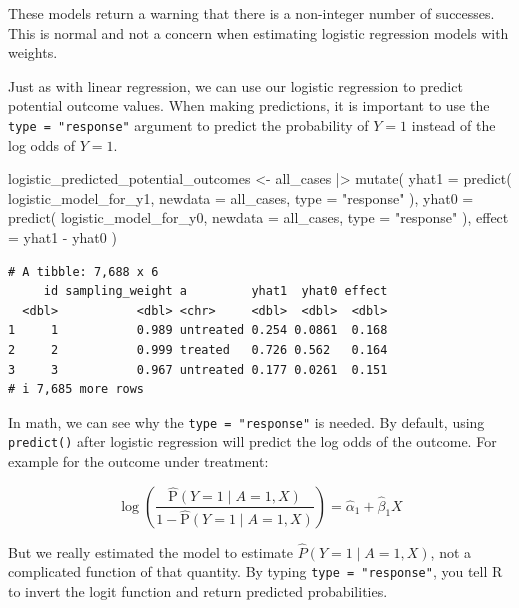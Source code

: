 \documentclass[
  letterpaper,
  DIV=11,
  numbers=noendperiod]{scrartcl}
\newenvironment{Shaded}{\begin{snugshade}}{\end{snugshade}}
\newcommand{\AttributeTok}[1]{\textcolor[rgb]{0.40,0.45,0.13}{#1}}
\newcommand{\FunctionTok}[1]{\textcolor[rgb]{0.28,0.35,0.67}{#1}}
\newcommand{\NormalTok}[1]{\textcolor[rgb]{0.00,0.23,0.31}{#1}}
\newcommand{\OtherTok}[1]{\textcolor[rgb]{0.00,0.23,0.31}{#1}}
\newcommand{\SpecialCharTok}[1]{\textcolor[rgb]{0.37,0.37,0.37}{#1}}
\newcommand{\StringTok}[1]{\textcolor[rgb]{0.13,0.47,0.30}{#1}}
\begin{document}
These models return a warning that there is a non-integer number of
successes. This is normal and not a concern when estimating logistic
regression models with weights.

Just as with linear regression, we can use our logistic regression to
predict potential outcome values. When making predictions, it is
important to use the \texttt{type\ =\ "response"} argument to predict
the probability of \(Y = 1\) instead of the log odds of \(Y = 1\).

\begin{Shaded}
\begin{Highlighting}[]
\NormalTok{logistic\_predicted\_potential\_outcomes }\OtherTok{\textless{}{-}}\NormalTok{ all\_cases }\SpecialCharTok{|\textgreater{}}
  \FunctionTok{mutate}\NormalTok{(}
    \AttributeTok{yhat1 =} \FunctionTok{predict}\NormalTok{(}
\NormalTok{      logistic\_model\_for\_y1, }
      \AttributeTok{newdata =}\NormalTok{ all\_cases, }
      \AttributeTok{type =} \StringTok{"response"}
\NormalTok{    ),}
    \AttributeTok{yhat0 =} \FunctionTok{predict}\NormalTok{(}
\NormalTok{      logistic\_model\_for\_y0, }
      \AttributeTok{newdata =}\NormalTok{ all\_cases, }
      \AttributeTok{type =} \StringTok{"response"}
\NormalTok{    ),}
    \AttributeTok{effect =}\NormalTok{ yhat1 }\SpecialCharTok{{-}}\NormalTok{ yhat0}
\NormalTok{  )}
\end{Highlighting}
\end{Shaded}

\begin{verbatim}
# A tibble: 7,688 x 6
     id sampling_weight a         yhat1  yhat0 effect
  <dbl>           <dbl> <chr>     <dbl>  <dbl>  <dbl>
1     1           0.989 untreated 0.254 0.0861  0.168
2     2           0.999 treated   0.726 0.562   0.164
3     3           0.967 untreated 0.177 0.0261  0.151
# i 7,685 more rows
\end{verbatim}

In math, we can see why the \texttt{type\ =\ "response"} is needed. By
default, using \texttt{predict()} after logistic regression will predict
the log odds of the outcome. For example for the outcome under
treatment:

\[
\log\left(\frac{\hat{\text{P}}(Y = 1\mid A = 1, X)}{1 - \hat{\text{P}}(Y = 1\mid A = 1, X)}\right) = \hat\alpha_1 + \hat\beta_1 X
\]

But we really estimated the model to estimate
\(\hat{P}(Y = 1\mid A = 1, X)\), not a complicated function of that
quantity. By typing \texttt{type\ =\ "response"}, you tell R to invert
the logit function and return predicted probabilities.
\end{document}
